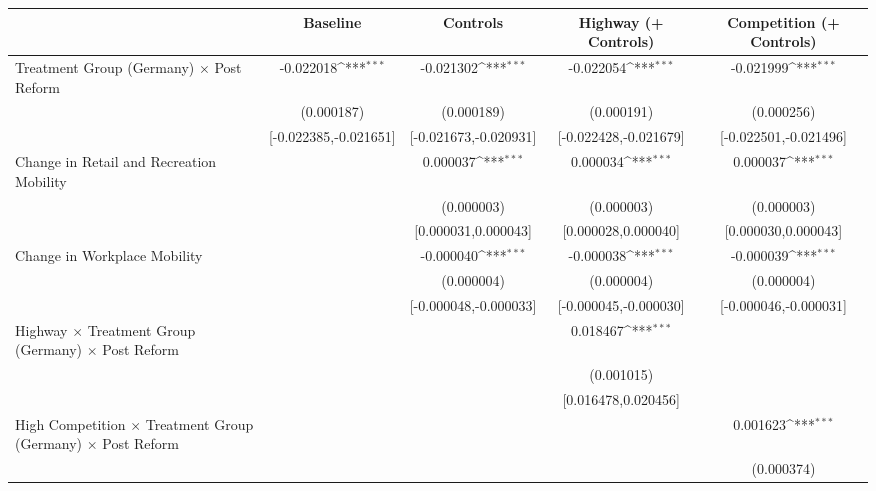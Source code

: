 {
\def\sym#1{\ifmmode^{#1}\else\(^{#1}\)\fi}
\begin{tabular}{l*{4}{c}}
\toprule
                    &\multicolumn{1}{c}{Baseline}&\multicolumn{1}{c}{Controls}&\multicolumn{1}{c}{Highway (+ Controls)}&\multicolumn{1}{c}{Competition (+ Controls)}\\
\midrule
Treatment Group (Germany) $\times$ Post Reform&   -0.022018\sym{***}&   -0.021302\sym{***}&   -0.022054\sym{***}&   -0.021999\sym{***}\\
                    &  (0.000187)         &  (0.000189)         &  (0.000191)         &  (0.000256)         \\
                    &[-0.022385,-0.021651]         &[-0.021673,-0.020931]         &[-0.022428,-0.021679]         &[-0.022501,-0.021496]         \\
Change in Retail and Recreation Mobility&                     &    0.000037\sym{***}&    0.000034\sym{***}&    0.000037\sym{***}\\
                    &                     &  (0.000003)         &  (0.000003)         &  (0.000003)         \\
                    &                     &[0.000031,0.000043]         &[0.000028,0.000040]         &[0.000030,0.000043]         \\
Change in Workplace Mobility&                     &   -0.000040\sym{***}&   -0.000038\sym{***}&   -0.000039\sym{***}\\
                    &                     &  (0.000004)         &  (0.000004)         &  (0.000004)         \\
                    &                     &[-0.000048,-0.000033]         &[-0.000045,-0.000030]         &[-0.000046,-0.000031]         \\
Highway $\times$ Treatment Group (Germany) $\times$ Post Reform&                     &                     &    0.018467\sym{***}&                     \\
                    &                     &                     &  (0.001015)         &                     \\
                    &                     &                     &[0.016478,0.020456]         &                     \\
High Competition $\times$ Treatment Group (Germany) $\times$ Post Reform&                     &                     &                     &    0.001623\sym{***}\\
                    &                     &                     &                     &  (0.000374)         \\

\end{tabular}}

